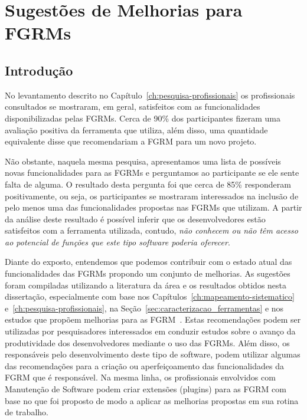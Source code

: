 \chapter{Sugestões de Melhorias para FGRMs}
\label{ch:sug_melhoria}

\section{Introdução}
\label{sec:sug_melhoria_intro}

No levantamento descrito no Capítulo~\ref{ch:pesquisa-profissionais} os
profissionais consultados se mostraram, em geral, satisfeitos com as
funcionalidades disponibilizadas pelas FGRMs. Cerca de 90\% dos
par\-ti\-ci\-pan\-tes fizeram uma avaliação positiva da ferramenta que utiliza,
além disso, uma quantidade equivalente disse que recomendariam a FGRM para um
novo projeto.

Não obstante, naquela mesma pesquisa, apresentamos uma lista de possíveis novas
funcionalidades para as FGRMs e perguntamos ao participante se ele sente falta
de alguma. O resultado desta pergunta foi que cerca de 85\% responderam
positivamente, ou seja, os participantes se mostraram interessados na inclusão
de pelo menos uma das funcionalidades propostas nas FGRMs que utilizam. A partir
da análise deste resultado é possível inferir que os desenvolvedores estão
satisfeitos com a ferramenta utilizada, contudo, \textit{não conhecem ou não têm
    acesso ao potencial de funções que este tipo software poderia oferecer}.

Diante do exposto, entendemos que podemos contribuir com o estado a\-tu\-al das
funcionalidades das FGRMs propondo um conjunto de melhorias. As sugestões foram
compiladas utilizando a literatura da área e os resultados obtidos nesta
dissertação, especialmente com base nos
Capítulos~\ref{ch:mapeamento-sistematico} e~\ref{ch:pesquisa-profissionais}, na
Seção~\ref{sec:caracterizacao_ferramentas} e nos estudos que propõem melhorias
para as FGRM~\cite{zimmermann2009improving, bettenburg2008makes, singh2011bug}.
Estas recomendações podem ser utilizadas por pesquisadores interessados em
conduzir estudos sobre o avanço da produtividade dos desenvolvedores mediante o
uso das FGRMs. Além disso, os responsáveis pelo desenvolvimento deste tipo de
software, podem utilizar algumas das recomendações para a criação ou
aperfeiçoamento das funcionalidades da FGRM que é responsável. Na mesma linha,
os profissionais envolvidos com Manutenção de Software podem criar extensões
(plugins) para as FGRM com base no que foi proposto de modo a aplicar as
melhorias propostas em sua rotina de trabalho.

